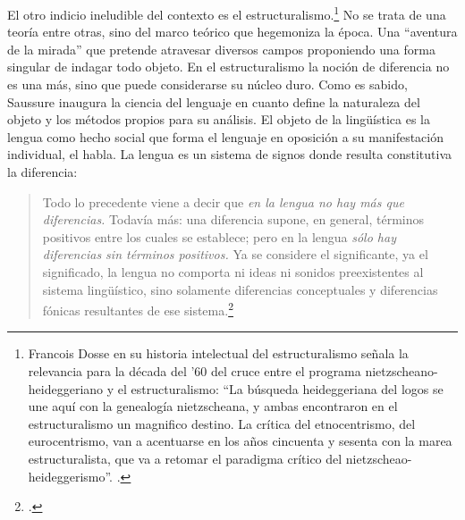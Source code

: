 El otro indicio ineludible del contexto es el estructuralismo.\footnote{Francois Dosse en su historia intelectual del estructuralismo señala la relevancia para la década del '60 del cruce entre el programa nietzscheano-heideggeriano y el estructuralismo: \enquote{La búsqueda heideggeriana del logos se une aquí con la genealogía nietzscheana, y ambas encontraron en el estructuralismo un magnifico destino. La crítica del etnocentrismo, del eurocentrismo, van a acentuarse en los años cincuenta y sesenta con la marea estructuralista, que va a retomar el paradigma crítico del nietzscheao-heideggerismo}. \cite[]{@6995-DOSSE2004}.} No se trata de una teoría entre otras, sino del marco teórico que hegemoniza la época. Una \enquote{aventura de la mirada} que pretende atravesar diversos campos proponiendo una forma singular de indagar todo objeto. En el estructuralismo la noción de diferencia no es una más, sino que puede considerarse su núcleo duro. Como es sabido, Saussure inaugura la ciencia del lenguaje en cuanto define la naturaleza del objeto y los métodos propios para su análisis. El objeto de la lingüística es la lengua como hecho social que forma el lenguaje en oposición a su manifestación individual, el habla. La lengua es un sistema de signos donde resulta constitutiva la diferencia:

\begin{quote}
Todo lo precedente viene a decir que \emph{en la lengua no hay más que diferencias.} Todavía más: una diferencia supone, en general, términos positivos entre los cuales se establece; pero en la lengua \emph{sólo hay diferencias sin términos positivos.} Ya se considere el significante, ya el significado, la lengua no comporta ni ideas ni sonidos preexistentes al sistema lingüístico, sino solamente diferencias conceptuales y diferencias fónicas resultantes de ese sistema.\footcite[144]{@6970-SAUSSURE1945}
\end{quote}

